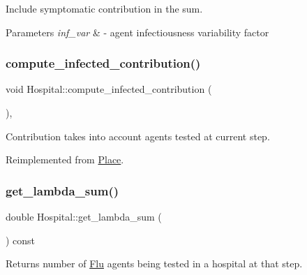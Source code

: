 Include symptomatic contribution in the sum. 


\begin{DoxyParams}{Parameters}
{\em inf\+\_\+var} & -\/ agent infectiousness variability factor \\
\hline
\end{DoxyParams}
\mbox{\label{classHospital_ad87fc4a53e50a35489c9024892a7c9d6}} 
\subsubsection{\texorpdfstring{compute\+\_\+infected\+\_\+contribution()}{compute\_infected\_contribution()}}
{\footnotesize\ttfamily void Hospital\+::compute\+\_\+infected\+\_\+contribution (\begin{DoxyParamCaption}{ }\end{DoxyParamCaption})\hspace{0.3cm}{\ttfamily [override]}, {\ttfamily [virtual]}}



Contribution takes into account agents tested at current step. 



Reimplemented from \hyperlink{classPlace_aeb4c561e8bc4e1ae7186baed6ef1aa47}{Place}.

\mbox{\label{classHospital_a640cbef59ed726254579948f399d0e8e}} 
\subsubsection{\texorpdfstring{get\+\_\+lambda\+\_\+sum()}{get\_lambda\_sum()}}
{\footnotesize\ttfamily double Hospital\+::get\+\_\+lambda\+\_\+sum (\begin{DoxyParamCaption}{ }\end{DoxyParamCaption}) const\hspace{0.3cm}{\ttfamily [inline]}}



Returns number of \hyperlink{classFlu}{Flu} agents being tested in a hospital at that step. 


